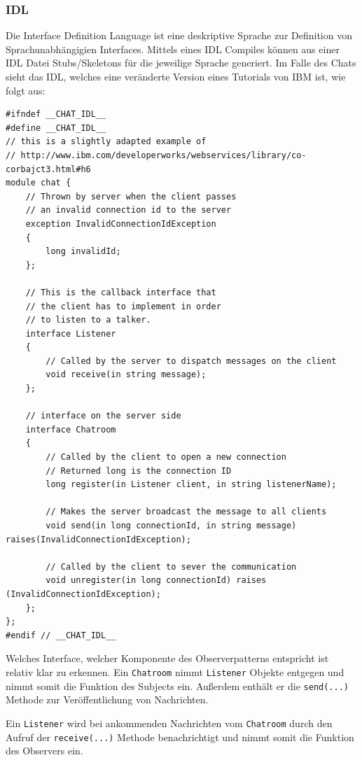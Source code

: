 \subsubsection{IDL}
Die Interface Definition Language ist eine deskriptive Sprache zur Definition von Sprachunabh\"angigien Interfaces.
Mittels eines IDL Compiles k\"onnen aus einer IDL Datei Stubs/Skeletons f\"ur die jeweilige Sprache generiert.
Im Falle des Chats sieht das IDL, welches eine ver\"anderte Version eines Tutorials von IBM ist, wie folgt aus:

\begin{lstlisting}[language={[CORBA]IDL}, caption=chat.idl]
#ifndef __CHAT_IDL__
#define __CHAT_IDL__
// this is a slightly adapted example of
// http://www.ibm.com/developerworks/webservices/library/co-corbajct3.html#h6
module chat {
    // Thrown by server when the client passes
    // an invalid connection id to the server
    exception InvalidConnectionIdException
    {
        long invalidId;
    };

    // This is the callback interface that
    // the client has to implement in order
    // to listen to a talker.
    interface Listener
    {
        // Called by the server to dispatch messages on the client
        void receive(in string message);
    };

    // interface on the server side
    interface Chatroom
    {
        // Called by the client to open a new connection
        // Returned long is the connection ID
        long register(in Listener client, in string listenerName);

        // Makes the server broadcast the message to all clients
        void send(in long connectionId, in string message) raises(InvalidConnectionIdException);

        // Called by the client to sever the communication
        void unregister(in long connectionId) raises (InvalidConnectionIdException);
    };
};
#endif // __CHAT_IDL__
\end{lstlisting}

Welches Interface, welcher Komponente des Observerpatterns entspricht ist relativ klar zu erkennen.
Ein \texttt{Chatroom} nimmt \texttt{Listener} Objekte entgegen und nimmt somit die Funktion des Subjects ein.
Au\ss erdem enth\"alt er die \texttt{send(...)} Methode zur Ver\"offentlichung von Nachrichten.

Ein \texttt{Listener} wird bei ankommenden Nachrichten vom \texttt{Chatroom} durch den Aufruf der \texttt{receive(...)} Methode benachrichtigt und nimmt somit die Funktion des Observers ein.

